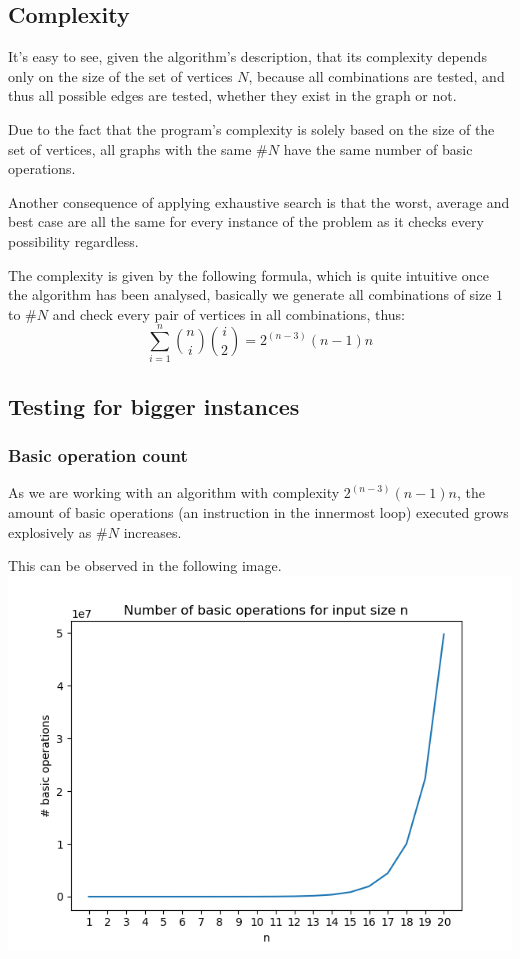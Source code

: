 \documentclass[...]{revdetua}
\begin{document}
\subsection{Complexity}
It's easy to see, given the algorithm's description, that its complexity depends only on the size of the set of vertices $N$, because all combinations are tested, and thus all possible edges are tested, whether they exist in the graph or not.\par
Due to the fact that the program's complexity is solely based on the size of the set of vertices, all graphs with the same $\#N$ have the same number of basic operations.\par
Another consequence of applying exhaustive search is that the worst, average and best case are all the same for every instance of the problem as it checks every possibility regardless. \par
The complexity is given by the following formula, which is quite intuitive once the algorithm has been analysed, basically we generate all combinations of size $1$ to $\#N$ and check every pair of vertices in all combinations, thus: 
$$\sum_{i=1}^{n}{{n}\choose{i}}{{i}\choose{2}}=2^{(n-3)}(n-1)n$$
\subsection{Testing for bigger instances}
\subsubsection{Basic operation count}
As we are working with an algorithm with complexity $2^{(n-3)}(n-1)n$, the amount of basic operations (an instruction in the innermost loop) executed grows explosively as $\#N$ increases.\par This can be observed in the following image.
\includegraphics[scale=0.5]{basic_ops.png}
\end{document}
